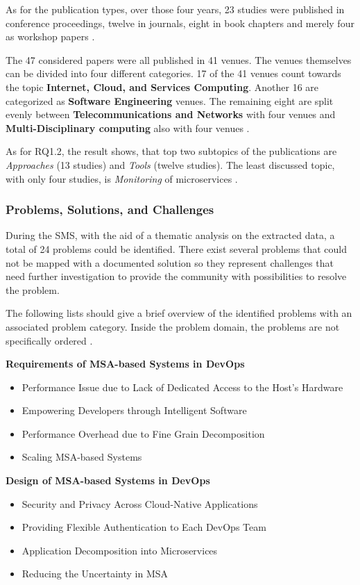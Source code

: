 As for the publication types, over those four years, 23 studies
were published in conference proceedings, twelve in journals, eight in book chapters
and merely four as workshop papers \cite{waseem:SMSMSADevOps}.

The 47 considered papers were all published in 41 venues. The venues
themselves can be divided into four different categories. 17 of the 41
venues count towards the topic \textbf{Internet, Cloud, and Services Computing}.
Another 16 are categorized as \textbf{Software Engineering} venues. The remaining
eight are split evenly between \textbf{Telecommunications and Networks} with four venues
and \textbf{Multi-Disciplinary computing} also with four venues \cite{waseem:SMSMSADevOps}.

As for RQ1.2, the result shows, that top two subtopics of the publications
are \textit{Approaches} (13 studies) and \textit{Tools} (twelve studies).
The least discussed topic, with only four studies, is \textit{Monitoring}
of microservices \cite{waseem:SMSMSADevOps}.

\subsubsection{Problems, Solutions, and Challenges}

During the SMS, with the aid of a thematic analysis on the
extracted data, a total of 24 problems could be identified.
There exist several problems that could not be mapped with a documented
solution so they represent challenges that need further investigation
to provide the community with possibilities to resolve the problem.

The following lists should give a brief overview of the identified
problems with an associated problem category. Inside the problem domain,
the problems are not specifically ordered \cite{waseem:SMSMSADevOps}.

\textbf{Requirements of MSA-based Systems in DevOps}
\begin{itemize}
    \item Performance Issue due to Lack of Dedicated Access
          to the Host's Hardware
    \item Empowering Developers through Intelligent Software
    \item Performance Overhead due to Fine Grain Decomposition
    \item Scaling MSA-based Systems
\end{itemize}

\textbf{Design of MSA-based Systems in DevOps}
\begin{itemize}
    \item Security and Privacy Across Cloud-Native Applications
    \item Providing Flexible Authentication to Each DevOps Team
    \item Application Decomposition into Microservices
    \item Reducing the Uncertainty in MSA
\end{itemize}

